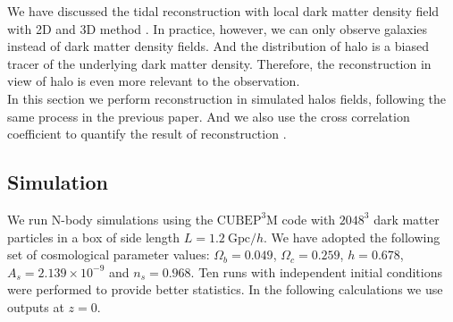 We have discussed the tidal reconstruction with local dark matter 
density field with 2D and 3D method \citep{2015:zhu}. 
In practice, however, we can only observe galaxies instead of dark matter
 density fields. And the distribution of halo is a biased tracer of the
  underlying dark matter density. Therefore, the reconstruction in view of
 halo is even more relevant to the observation.\\

In this section we perform reconstruction in simulated halos fields,
following the same process in the previous paper. And we also 
use the cross correlation coefficient to quantify the result
of reconstruction .\\

\subsection{Simulation}
We run N-body simulations using the $\mathrm{CUBEP^3M}$ code with $2048^3$
 dark matter particles in a box of side length $L=1.2\ \mathrm{Gpc}/h$.
  We have
 adopted the following set of cosmological parameter values:
 $\Omega_{b}=0.049$, $\Omega_{c}=0.259$, $h=0.678$, 
 $A_s=2.139\times 10^{-9}$ and $n_s=0.968$.
 Ten runs with independent initial conditions were performed to provide
  better statistics. In the following calculations we use outputs 
  at $z=0$. \\
  
